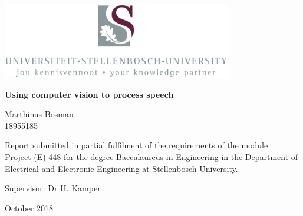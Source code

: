 \graphicspath{{frontmatter/fig/}}

\begin{titlepage}
\begin{center}

\includegraphics[width=10cm]{USlogo-top}

\vfill

{\rmfamily \bfseries \huge Using computer vision to process speech \par}

\vfill

{\large {\Large Marthinus Bosman} \\ 18955185 \par}

\vfill

\vfill

{Report submitted in partial fulfilment of the requirements of the module \\
Project (E) 448 for the degree Baccalaureus in Engineering in the Department of
Electrical and Electronic Engineering at Stellenbosch University. \par}

\vfill

{\large {Supervisor}: Dr H. Kamper} %

\vfill

{\Large October 2018}
\end{center}
\end{titlepage}

